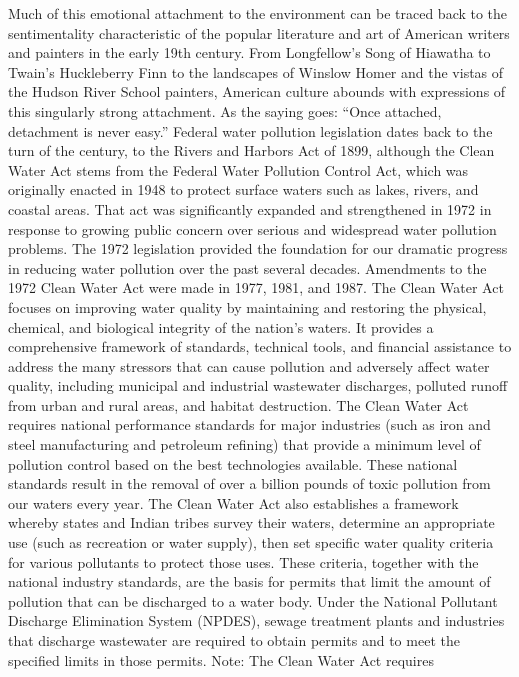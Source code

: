 \documentclass{article}
\begin{document}
Much of this emotional attachment to the environment can be traced back
to the sentimentality characteristic of the popular literature and art
of American writers and painters in the early 19th century. From
Longfellow's Song of Hiawatha to Twain's Huckleberry Finn to the
landscapes of Winslow Homer and the vistas of the Hudson River School
painters, American culture abounds with expressions of this singularly
strong attachment. As the saying goes: ``Once attached, detachment is
never easy.'' Federal water pollution legislation dates back to the turn
of the century, to the Rivers and Harbors Act of 1899, although the
Clean Water Act stems from the Federal Water Pollution Control Act,
which was originally enacted in 1948 to protect surface waters such as
lakes, rivers, and coastal areas. That act was significantly expanded
and strengthened in 1972 in response to growing public concern over
serious and widespread water pollution problems. The 1972 legislation
provided the foundation for our dramatic progress in reducing water
pollution over the past several decades. Amendments to the 1972 Clean
Water Act were made in 1977, 1981, and 1987. The Clean Water Act focuses
on improving water quality by maintaining and restoring the physical,
chemical, and biological integrity of the nation's waters. It provides a
comprehensive framework of standards, technical tools, and financial
assistance to address the many stressors that can cause pollution and
adversely affect water quality, including municipal and industrial
wastewater discharges, polluted runoff from urban and rural areas, and
habitat destruction. The Clean Water Act requires national performance
standards for major industries (such as iron and steel manufacturing and
petroleum refining) that provide a minimum level of pollution control
based on the best technologies available. These national standards
result in the removal of over a billion pounds of toxic pollution from
our waters every year. The Clean Water Act also establishes a framework
whereby states and Indian tribes survey their waters, determine an
appropriate use (such as recreation or water supply), then set specific
water quality criteria for various pollutants to protect those uses.
These criteria, together with the national industry standards, are the
basis for permits that limit the amount of pollution that can be
discharged to a water body. Under the National Pollutant Discharge
Elimination System (NPDES), sewage treatment plants and industries that
discharge wastewater are required to obtain permits and to meet the
specified limits in those permits. Note: The Clean Water Act requires
\end{document}
